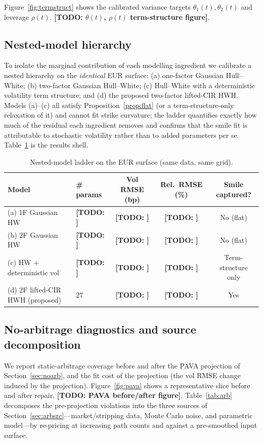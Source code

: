 \documentclass[11pt]{article}
\newcommand{\TODO}[1]{\textbf{[TODO: #1]}}
\theoremstyle{plain}
\theoremstyle{definition}
\begin{document}
Figure~\ref{fig:termstruct} shows the calibrated variance targets
$\theta_1(t),\theta_2(t)$ and leverage $\rho(t)$. \TODO{$\theta(t)$, $\rho(t)$
term-structure figure}.

\subsection{Nested-model hierarchy}
\label{sec:nested}

To isolate the marginal contribution of each modelling ingredient we calibrate a
nested hierarchy on the \emph{identical} EUR surface: (a) one-factor Gaussian
Hull--White; (b) two-factor Gaussian Hull--White; (c) Hull--White with a
deterministic volatility term structure; and (d) the proposed two-factor
lifted-CIR HWH. Models (a)--(c) all satisfy Proposition~\ref{prop:flat} (or a
term-structure-only relaxation of it) and cannot fit strike curvature; the ladder
quantifies exactly how much of the residual each ingredient removes and confirms
that the smile fit is attributable to stochastic volatility rather than to added
parameters per se. Table~\ref{tab:nested} is the results shell.

\begin{table}[t]
\centering
\caption{Nested-model ladder on the EUR surface (same data, same grid).}
\label{tab:nested}
\begin{tabular}{llccc}
\toprule
Model & \# params & Vol RMSE (bp) & Rel.\ RMSE (\%) & Smile captured? \\
\midrule
(a) 1F Gaussian HW               & \TODO{} & \TODO{} & \TODO{} & No (flat) \\
(b) 2F Gaussian HW               & \TODO{} & \TODO{} & \TODO{} & No (flat) \\
(c) HW + deterministic vol       & \TODO{} & \TODO{} & \TODO{} & Term-structure only \\
(d) 2F lifted-CIR HWH (proposed) & $27$    & \TODO{} & \TODO{} & Yes \\
\bottomrule
\end{tabular}
\end{table}

\subsection{No-arbitrage diagnostics and source decomposition}

We report static-arbitrage coverage before and after the PAVA projection of
Section~\ref{sec:noarb}, and the fit cost of the projection (the vol RMSE change
induced by the projection). Figure~\ref{fig:pava} shows a representative slice
before and after repair. \TODO{PAVA before/after figure}. Table~\ref{tab:arb}
decomposes the pre-projection violations into the three sources of
Section~\ref{sec:arbsrc}---market/stripping data, Monte Carlo noise, and
parametric model---by re-pricing at increasing path counts and against a
pre-smoothed input surface.
\end{document}
